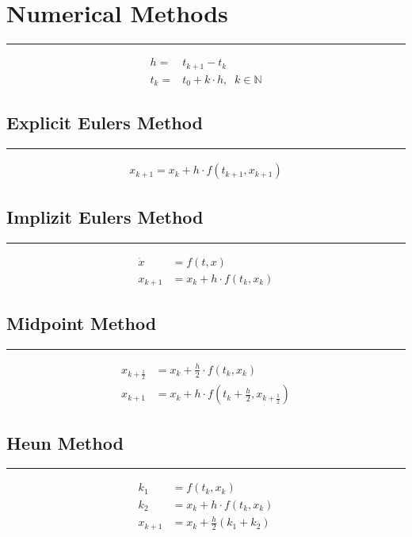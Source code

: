 \section{Numerical Methods}
\noindent\rule[\linienAbstand]{\linewidth}{\linienDickeDick}
\begin{equation}
  \begin{split}
    h =& t_{k+1} - t_k\\
    t_k =& t_0 + k \cdot h, \;\; k \in \mathbb{N}
  \end{split}
\end{equation}

\subsection{Explicit Eulers Method}
\noindent\rule[\linienAbstand]{\linewidth}{\linienDicke}
\begin{equation}
  \begin{split}
    x_{k+1} = x_k + h \cdot f(t_{k+1}, x_{k+1})
  \end{split}
\end{equation}

\subsection{Implizit Eulers Method}
\noindent\rule[\linienAbstand]{\linewidth}{\linienDicke}
\begin{equation}
  \begin{split}
    \dot{x} &= f(t, x)\\
    x_{k+1} &= x_k + h \cdot f(t_k, x_k)
  \end{split}
\end{equation}

\subsection{Midpoint Method}
\noindent\rule[\linienAbstand]{\linewidth}{\linienDicke}
\begin{equation}
  \begin{split}
    x_{k+\frac{1}{2}} &= x_k + \frac{h}{2} \cdot f(t_k, x_k)\\
    x_{k+1}           &= x_k + h \cdot f(t_{k} + \frac{h}{2}, x_{k+\frac{1}{2}})
  \end{split}
\end{equation}

\subsection{Heun Method}
\noindent\rule[\linienAbstand]{\linewidth}{\linienDicke}
\begin{equation}
  \begin{split}
    k_1 &= f(t_k, x_k)\\
    k_2 &= x_k + h \cdot f(t_k, x_k)\\
    x_{k+1} &= x_k + \frac{h}{2}(k_1 + k_2)
  \end{split}
\end{equation}

